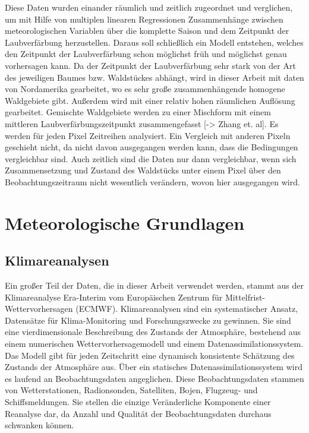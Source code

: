 \documentclass[]{article}
\begin{document}
Diese Daten wurden einander räumlich und zeitlich zugeordnet und verglichen, um mit Hilfe von multiplen linearen Regressionen Zusammenhänge zwischen meteorologischen Variablen über die komplette Saison und dem Zeitpunkt der Laubverfärbung herzustellen. Daraus soll schließlich ein Modell entstehen, welches den Zeitpunkt der Laubverfärbung schon möglichst früh und möglichst genau vorhersagen kann. Da der Zeitpunkt der Laubverfärbung sehr stark von der Art des jeweiligen Baumes bzw. Waldstückes abhängt, wird in dieser Arbeit mit daten von Nordamerika gearbeitet, wo es sehr große zusammenhängende homogene Waldgebiete gibt. Außerdem wird mit einer relativ hohen räumlichen Auflösung gearbeitet. Gemischte Waldgebiete werden zu einer Mischform mit einem mittleren Laubverfärbungszeitpunkt zusammengefasst [-> Zhang et. al]. Es werden für jeden Pixel Zeitreihen analysiert. Ein Vergleich mit anderen Pixeln geschieht nicht, da nicht davon ausgegangen werden kann, dass die Bedingungen vergleichbar sind. Auch zeitlich sind die Daten nur dann vergleichbar, wenn sich Zusammensetzung und Zustand des Waldstücks unter einem Pixel über den Beobachtungszeitraum nicht wesentlich verändern, wovon hier ausgegangen wird.

\newpage
\section{Meteorologische Grundlagen}
\subsection{Klimareanalysen}
Ein großer Teil der Daten, die in dieser Arbeit verwendet werden, stammt aus der Klimareanalyse Era-Interim vom Europäischen Zentrum für Mittelfrist-Wettervorhersagen (ECMWF). Klimareanalysen sind ein systematischer Ansatz, Datensätze für Klima-Monitoring und Forschungszwecke zu gewinnen. Sie sind eine vierdimensionale Beschreibung des Zustands der Atmosphäre, bestehend aus einem numerischen Wettervorhersagemodell und einem Datenassimilationssystem. Das Modell gibt für jeden Zeitschritt eine dynamisch konsistente Schätzung des Zustands der Atmosphäre aus. Über ein statisches Datenassimilationssystem wird es laufend an Beobachtungsdaten angeglichen. Diese Beobachtungsdaten stammen von Wetterstationen, Radionsonden, Satelliten, Bojen, Flugzeug- und Schiffsmeldungen. Sie stellen die einzige Veränderliche Komponente einer Reanalyse dar, da Anzahl und Qualität der Beobachtungsdaten durchaus schwanken können. 
\end{document}
